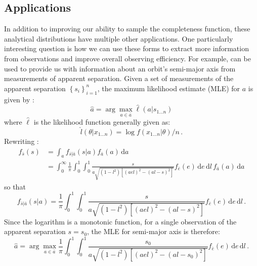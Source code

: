 \subsection{Applications}
In addition to improving our ability to sample the completeness function, these analytical distributions have multiple other applications.  One particularly interesting question is how we can use these forms to extract more information from observations and improve overall observing efficiency.  For example,  can be used to provide us with information about an orbit's semi-major axis from measurements of apparent separation.  Given a set of measurements of the apparent separation $\left\{s_i\right\}_{i = 1}^n$, the maximum likelihood estimate (MLE) for $a$ is given by \citep{ogunnaike2009random}:
\begin{equation}
\hat a = \arg\max_{a \in \bar a} \hat \ell \left(a \vert s_{1\ldots n}\right)
\end{equation}
where $\hat \ell$ is the likelihood function generally given as:
\begin{equation}
\hat l\left(\theta\vert x_{1\ldots n}\right)= \log f\left(x_{1\ldots n} \vert \theta\right)/n \, .
\end{equation}
Rewriting :
\begin{align}
f_{\bar s}(s) &= \int_a f_{\bar s\vert\bar a}\left(s \vert a\right)f_{\bar{a}}(a)\, \mathrm{d}a\\
& =  \int_{0}^{\infty}\frac{1}{\pi}  \int_{0}^1  \int_{0}^{1} \frac{s}{a\sqrt{\left(1 - l^2\right)\left[(ael)^2 - (al-s)^2\right]}}f_{\bar{e}}(e) \, \mathrm{d}e \, \mathrm{d}l  \,  f_{\bar{a}}(a)\, \mathrm{d}a \nonumber
\end{align}
so that
\begin{equation}
 f_{\bar s\vert\bar a}\left(s \vert a\right)  = \frac{1}{\pi}  \int_{0}^1  \int_{0}^{1} \frac{s}{a\sqrt{\left(1 - l^2\right)\left[(ael)^2 - (al-s)^2\right]}}f_{\bar{e}}(e) \, \mathrm{d}e \, \mathrm{d}l  \,.
\end{equation}
Since the logarithm is a monotonic function, for a single observation of the apparent separation $s = s_0$, the MLE for semi-major axis is therefore:
\begin{equation}\label{eq:aMLE}
\hat a = \arg\max_{a \in \bar a}   \frac{1}{\pi}  \int_{0}^1  \int_{0}^{1} \frac{s_0}{a\sqrt{\left(1 - l^2\right)\left[(ael)^2 - (al-s_0)^2\right]}}f_{\bar{e}}(e) \, \mathrm{d}e \, \mathrm{d}l \,.
\end{equation}

